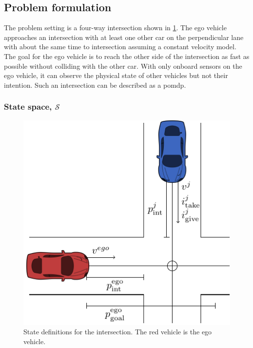 \subsection{Problem formulation}
\label{sec:pomdp}

The problem setting is a four-way intersection shown in \ref{fig:states}. The ego vehicle approaches an intersection with at least one other car on the perpendicular lane with about the same time to intersection assuming a constant velocity model. The goal for the ego vehicle is to reach the other side of the intersection as fast as possible without colliding with the other car. With only onboard sensors on the ego vehicle, it can observe the physical state of other vehicles but not their intention. 
Such an intersection can be described as a \gls{pomdp}.

\subsubsection{State space, $\mathcal{S}$}
\begin{figure}[!t]
    \centering
        \includegraphics[width=0.6\columnwidth]{figures/figures-observations.pdf}
        \caption{State definitions for the intersection. The red vehicle is the ego vehicle.}
    \label{fig:states}
\end{figure}

